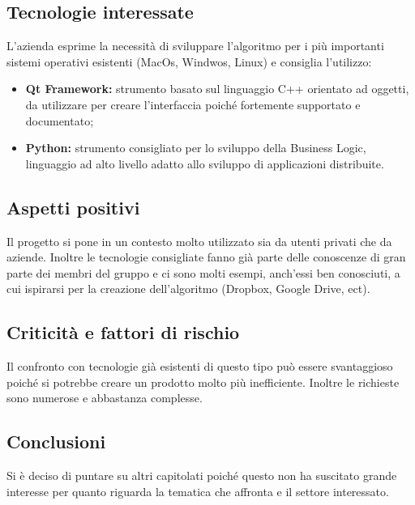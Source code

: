 \subsection{Tecnologie interessate}
L'azienda esprime la necessità di sviluppare l'algoritmo per i più importanti sistemi operativi esistenti (MacOs, Windwos, Linux) e consiglia l'utilizzo:
\begin{itemize}
\item \textbf{Qt Framework:} strumento basato sul linguaggio C++ orientato ad oggetti, da utilizzare per creare l'interfaccia poiché fortemente supportato e documentato;
\item \textbf{Python:} strumento consigliato per lo sviluppo della Business Logic, linguaggio ad alto livello adatto allo sviluppo di applicazioni distribuite.
\end{itemize}
\subsection{Aspetti positivi}
Il progetto si pone in un contesto molto utilizzato sia da utenti privati che da aziende. Inoltre le tecnologie consigliate fanno già parte delle conoscenze di gran parte dei membri del gruppo e ci sono molti esempi, anch'essi ben conosciuti, a cui ispirarsi per la creazione dell'algoritmo (Dropbox, Google Drive, ect). 
\subsection{Criticità e fattori di rischio}
Il confronto con tecnologie già esistenti di questo tipo può essere svantaggioso poiché si potrebbe creare un prodotto molto più inefficiente. Inoltre le richieste sono numerose e abbastanza complesse. 
\subsection{Conclusioni}
Si è deciso di puntare su altri capitolati poiché questo non ha suscitato grande interesse per quanto riguarda la tematica che affronta e il settore interessato. 